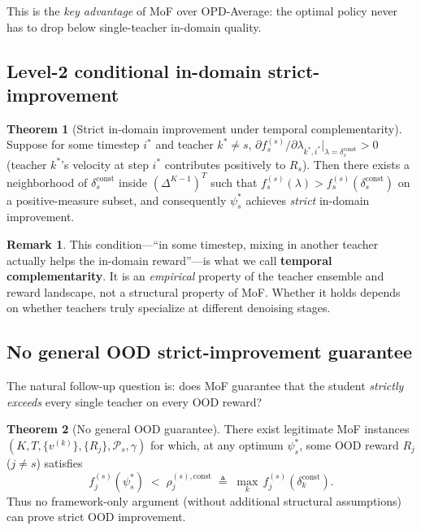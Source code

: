 \documentclass[11pt,a4paper]{article}
\newcommand{\const}{\mathrm{const}}
\theoremstyle{definition}
\newtheorem{remark}{Remark}
\newtheorem{theorem}{Theorem}
\begin{document}
This is the \emph{key advantage} of MoF over OPD-Average: the optimal
policy never has to drop below single-teacher in-domain quality.

\subsection{Level-2 conditional in-domain strict-improvement}
\label{ssec:level2}

\begin{theorem}[Strict in-domain improvement under temporal complementarity]
\label{thm:level2}
Suppose for some timestep $i^*$ and teacher $k^*\neq s$,
$\partial f_s^{(s)}/\partial \lambda_{k^*,i^*}|_{\lambda=\delta_s^{\const}}>0$
(teacher $k^*$'s velocity at step $i^*$ contributes positively to $R_s$).
Then there exists a neighborhood of $\delta_s^{\const}$ inside
$(\Delta^{K-1})^T$ such that
$f_s^{(s)}(\lambda) > f_s^{(s)}(\delta_s^{\const})$ on a positive-measure
subset, and consequently $\psi_s^*$ achieves \emph{strict} in-domain
improvement.
\end{theorem}

\begin{remark}
This condition---``in some timestep, mixing in another teacher actually
helps the in-domain reward''---is what we call \textbf{temporal
complementarity}. It is an \emph{empirical} property of the teacher
ensemble and reward landscape, not a structural property of MoF. Whether
it holds depends on whether teachers truly specialize at different
denoising stages.
\end{remark}

\subsection{No general OOD strict-improvement guarantee}
\label{ssec:no_ood}

The natural follow-up question is: does MoF guarantee that the student
\emph{strictly exceeds} every single teacher on every OOD reward?

\begin{theorem}[No general OOD guarantee]
\label{thm:no_ood}
There exist legitimate MoF instances
$(K,T,\{v^{(k)}\},\{R_j\},\mathcal{P}_s,\gamma)$ for which, at any optimum
$\psi^*_s$, some OOD reward $R_j$ ($j\neq s$) satisfies
\begin{equation}
f_j^{(s)}(\psi^*_s) \;<\;
\rho_j^{(s),\const} \;\triangleq\; \max_{k}\,f_j^{(s)}(\delta_k^{\const}).
\end{equation}
Thus no framework-only argument (without additional structural
assumptions) can prove strict OOD improvement.
\end{theorem}
\end{document}
